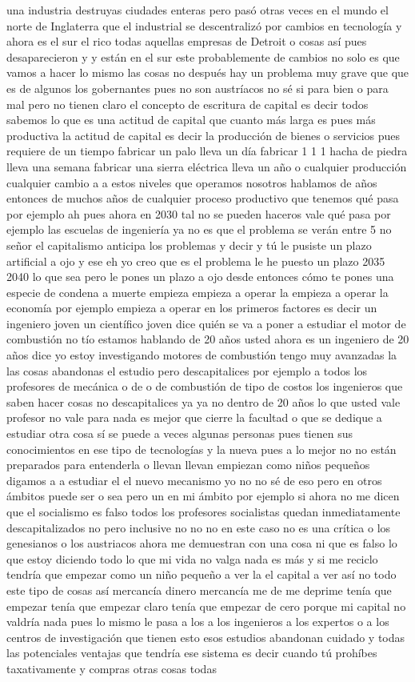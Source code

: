 una industria destruyas ciudades enteras pero pasó otras veces en el mundo el norte de Inglaterra que el industrial se descentralizó por cambios en tecnología y ahora es el sur el rico todas aquellas empresas de Detroit o cosas así pues desaparecieron y y están en el sur este probablemente de cambios no solo es que vamos a hacer lo mismo las cosas no después hay un problema muy grave que que es de algunos los gobernantes pues no son austríacos no sé si para bien o para mal pero no tienen claro el concepto de escritura de capital es decir todos sabemos lo que es una actitud de capital que cuanto más larga es pues más productiva la actitud de capital es decir la producción de bienes o servicios pues requiere de un tiempo fabricar un palo lleva un día fabricar 1 1 1 hacha de piedra lleva una semana fabricar una sierra eléctrica lleva un año o cualquier producción cualquier cambio a a estos niveles que operamos nosotros hablamos de años entonces de muchos años de cualquier proceso productivo que tenemos qué pasa por ejemplo ah pues ahora en 2030 tal no se pueden haceros vale qué pasa por ejemplo las escuelas de ingeniería ya no es que el problema se verán entre 5 no señor el capitalismo anticipa los problemas y decir y tú le pusiste un plazo artificial a ojo y ese eh yo creo que es el problema le he puesto un plazo 2035 2040 lo que sea pero le pones un plazo a ojo desde entonces cómo te pones una especie de condena a muerte empieza empieza a operar la empieza a operar la economía por ejemplo empieza a operar en los primeros factores es decir un ingeniero joven un científico joven dice quién se va a poner a estudiar el motor de combustión no tío estamos hablando de 20 años usted ahora es un ingeniero de 20 años dice yo estoy investigando motores de combustión tengo muy avanzadas la las cosas abandonas el estudio pero descapitalices por ejemplo a todos los profesores de mecánica o de o de combustión de tipo de costos los ingenieros que saben hacer cosas no descapitalices ya ya no dentro de 20 años lo que usted vale profesor no vale para nada es mejor que cierre la facultad o que se dedique a estudiar otra cosa sí se puede a veces algunas personas pues tienen sus conocimientos en ese tipo de tecnologías y la nueva pues a lo mejor no no están preparados para entenderla o llevan llevan empiezan como niños pequeños digamos a a estudiar el el nuevo mecanismo yo no no sé de eso pero en otros ámbitos puede ser o sea pero un en mi ámbito por ejemplo si ahora no me dicen que el socialismo es falso todos los profesores socialistas quedan inmediatamente descapitalizados no pero inclusive no no no en este caso no es una crítica o los genesianos o los austriacos ahora me demuestran con una cosa ni que es falso lo que estoy diciendo todo lo que mi vida no valga nada es más y si me reciclo tendría que empezar como un niño pequeño a ver la el capital a ver así no todo este tipo de cosas así mercancía dinero mercancía me de me deprime tenía que empezar tenía que empezar claro tenía que empezar de cero porque mi capital no valdría nada pues lo mismo le pasa a los a los ingenieros a los expertos o a los centros de investigación que tienen esto esos estudios abandonan cuidado y todas las potenciales ventajas que tendría ese sistema es decir cuando tú prohíbes taxativamente y compras otras cosas todas 